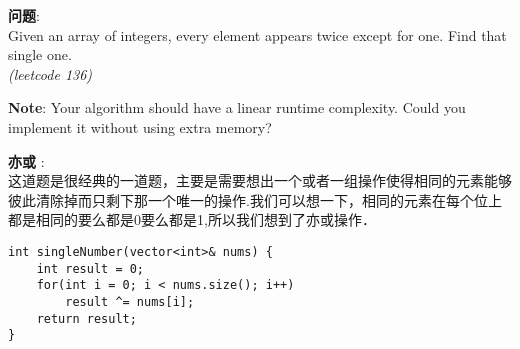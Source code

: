     
\begin{description}
    \item{\textbf{问题}}:\\
Given an array of integers, every element appears twice except for one. Find that single one.\\
\textit{(leetcode 136)}
    \item{\textbf{Note}}: 
Your algorithm should have a linear runtime complexity. Could you implement it without using extra memory?
    \item{\textbf{亦或}} : 
    \\这道题是很经典的一道题，主要是需要想出一个或者一组操作使得相同的元素能够彼此清除掉而只剩下那一个唯一的操作.我们可以想一下，相同的元素在每个位上都是相同的要么都是0要么都是1,所以我们想到了亦或操作．
    \begin{lstlisting}
int singleNumber(vector<int>& nums) {
	int result = 0;
	for(int i = 0; i < nums.size(); i++)
		result ^= nums[i];
	return result;
}
    \end{lstlisting}
\end{description}
